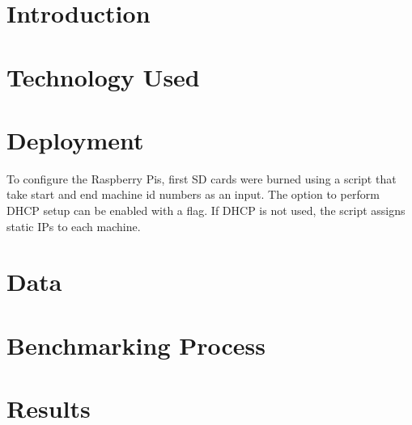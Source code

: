 

\maketitle

\section{Introduction}


\section{Technology Used}



\section{Deployment}
To configure the Raspberry Pis, first SD cards were burned using a
script that take start and end machine id numbers as an input. The
option to perform DHCP setup can be enabled with a flag. If DHCP is
not used, the script assigns static IPs to each machine.

\section{Data}


\section{Benchmarking Process}


\section{Results}

